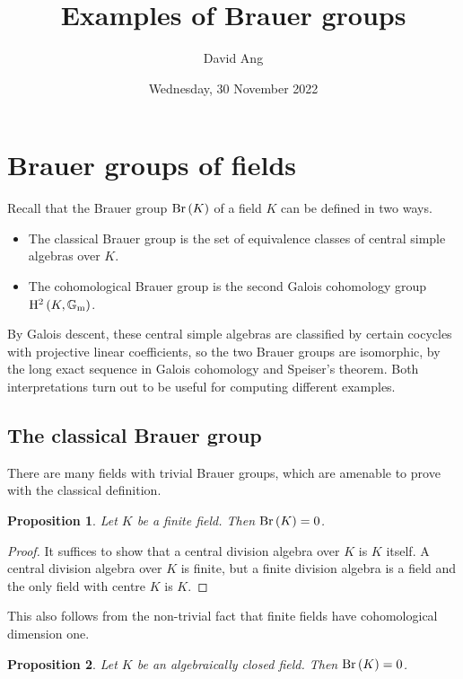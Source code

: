 \documentclass{article}
\title{Examples of Brauer groups}
\author{David Ang}
\date{Wednesday, 30 November 2022}
\newtheorem*{proposition}{Proposition}
\newcommand{\br}{\del}
\newcommand{\Br}{\mathrm{Br}}
\newcommand{\Gm}{\mathbb{G}_\mathrm{m}}
\renewcommand{\H}{\mathrm{H}}
\begin{document}
\maketitle

\section{Brauer groups of fields}

Recall that the Brauer group $ \Br\br{K} $ of a field $ K $ can be defined in two ways.
\begin{itemize}
\item The classical Brauer group is the set of equivalence classes of central simple algebras over $ K $.
\item The cohomological Brauer group is the second Galois cohomology group $ \H^2\br{K, \Gm} $.
\end{itemize}
By Galois descent, these central simple algebras are classified by certain cocycles with projective linear coefficients, so the two Brauer groups are isomorphic, by the long exact sequence in Galois cohomology and Speiser's theorem. Both interpretations turn out to be useful for computing different examples.

\subsection{The classical Brauer group}

There are many fields with trivial Brauer groups, which are amenable to prove with the classical definition.

\begin{proposition}
Let $ K $ be a finite field. Then $ \Br\br{K} = 0 $.
\end{proposition}

\begin{proof}
It suffices to show that a central division algebra over $ K $ is $ K $ itself. A central division algebra over $ K $ is finite, but a finite division algebra is a field and the only field with centre $ K $ is $ K $.
\end{proof}

This also follows from the non-trivial fact that finite fields have cohomological dimension one.

\begin{proposition}
Let $ K $ be an algebraically closed field. Then $ \Br\br{K} = 0 $.
\end{proposition}
\end{document}
